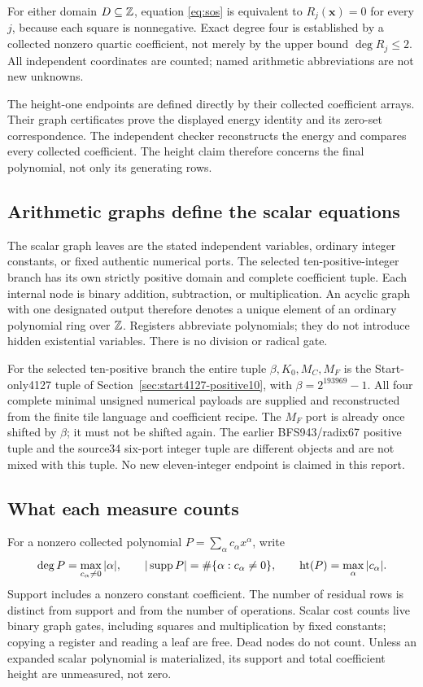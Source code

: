 For either domain $D\subseteq\mathbb Z$, equation \eqref{eq:sos} is equivalent to
$R_j(\boldsymbol{x})=0$ for every $j$, because each square is nonnegative.
Exact degree four is established by a collected nonzero quartic coefficient,
not merely by the upper bound $\deg R_j\le2$. All independent coordinates
are counted; named arithmetic abbreviations are not new unknowns.

The height-one endpoints are defined directly by their collected coefficient
arrays. Their graph certificates prove the displayed energy identity and
its zero-set correspondence. The independent checker reconstructs the
energy and compares every collected coefficient. The height claim therefore
concerns the final polynomial, not only its generating rows.

\subsection{Arithmetic graphs define the scalar equations}
The scalar graph leaves are the stated independent variables, ordinary
integer constants, or fixed authentic numerical ports. The selected ten-positive-integer branch has its own strictly positive
domain and complete coefficient tuple. Each internal node is binary addition, subtraction, or multiplication.
An acyclic graph with one designated output therefore denotes a unique
element of an ordinary polynomial ring over $\mathbb Z$. Registers abbreviate
polynomials; they do not introduce hidden existential variables. There is
no division or radical gate.

For the selected ten-positive branch the entire tuple
$\beta,K_0,M_C,M_F$ is the Start-only4127 tuple of
Section~\ref{sec:start4127-positive10}, with $\beta=2^{193969}-1$.
All four complete minimal unsigned numerical payloads are supplied and
reconstructed from the finite tile language and coefficient recipe. The
$M_F$ port is already once shifted by $\beta$; it must not be shifted again.
The earlier BFS943/radix67 positive tuple and the source34 six-port
integer tuple are different objects and are not mixed with this tuple.
No new eleven-integer endpoint is claimed in this report.

\subsection{What each measure counts}
For a nonzero collected polynomial $P=\sum_\alpha c_\alpha x^\alpha$, write
\[
 \deg P=\max_{c_\alpha\ne0}|\alpha|,\qquad
 |\operatorname{supp} P|=\#\{\alpha:c_\alpha\ne0\},\qquad
 \operatorname{ht}(P)=\max_\alpha|c_\alpha|.
\]
Support includes a nonzero constant coefficient. The number of residual
rows is distinct from support and from the number of operations. Scalar
cost counts live binary graph gates, including squares and multiplication
by fixed constants; copying a register and reading a leaf are free. Dead
nodes do not count. Unless an expanded scalar polynomial is materialized,
its support and total coefficient height are unmeasured, not zero.

